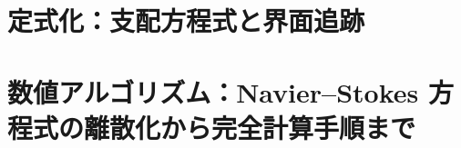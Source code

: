 \documentclass[12pt, a4paper, titlepage, xelatex, ja=standard, oneside]{bxjsarticle}
\begin{document}
\hypersetup{pageanchor=false}%

\tableofcontents
\clearpage
{}
\hypersetup{pageanchor=true}

\clearpage
\part{定式化：支配方程式と界面追跡}
\clearpage
\clearpage

\clearpage
\part{数値アルゴリズム：Navier--Stokes 方程式の離散化から完全計算手順まで}


\clearpage
\end{document}
